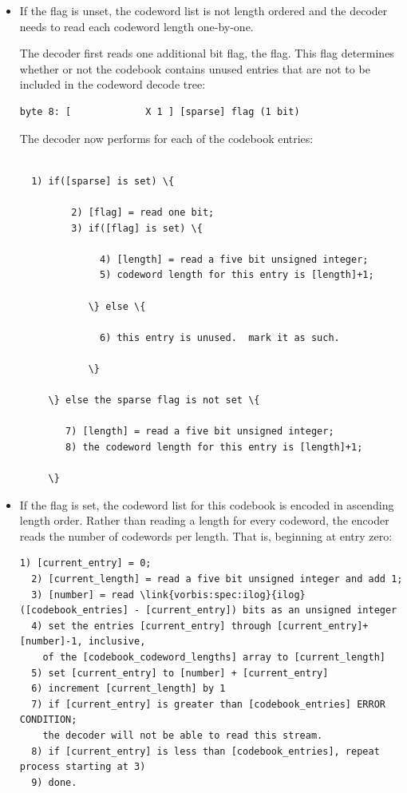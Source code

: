 \begin{itemize}
\item
  If the \varname{[ordered]} flag is unset, the codeword list is not
  length ordered and the decoder needs to read each codeword length
  one-by-one.

  The decoder first reads one additional bit flag, the
  \varname{[sparse]} flag.  This flag determines whether or not the
  codebook contains unused entries that are not to be included in the
  codeword decode tree:

\begin{Verbatim}[commandchars=\\\{\}]
byte 8: [             X 1 ] [sparse] flag (1 bit)
\end{Verbatim}

  The decoder now performs for each of the 
  codebook entries:

\begin{Verbatim}[commandchars=\\\{\}]

  1) if([sparse] is set) \{

         2) [flag] = read one bit;
         3) if([flag] is set) \{

              4) [length] = read a five bit unsigned integer;
              5) codeword length for this entry is [length]+1;

            \} else \{

              6) this entry is unused.  mark it as such.

            \}

     \} else the sparse flag is not set \{

        7) [length] = read a five bit unsigned integer;
        8) the codeword length for this entry is [length]+1;

     \}

\end{Verbatim}

\item
  If the \varname{[ordered]} flag is set, the codeword list for this
  codebook is encoded in ascending length order.  Rather than reading
  a length for every codeword, the encoder reads the number of
  codewords per length.  That is, beginning at entry zero:

\begin{Verbatim}[commandchars=\\\{\}]
  1) [current_entry] = 0;
  2) [current_length] = read a five bit unsigned integer and add 1;
  3) [number] = read \link{vorbis:spec:ilog}{ilog}([codebook_entries] - [current_entry]) bits as an unsigned integer
  4) set the entries [current_entry] through [current_entry]+[number]-1, inclusive,
    of the [codebook_codeword_lengths] array to [current_length]
  5) set [current_entry] to [number] + [current_entry]
  6) increment [current_length] by 1
  7) if [current_entry] is greater than [codebook_entries] ERROR CONDITION;
    the decoder will not be able to read this stream.
  8) if [current_entry] is less than [codebook_entries], repeat process starting at 3)
  9) done.
\end{Verbatim}

\end{itemize}

